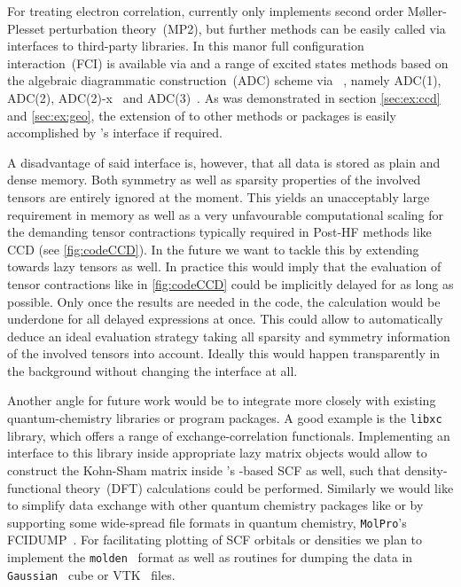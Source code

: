 For treating electron correlation,
\molsturm currently only implements
second order Møller-Plesset perturbation theory~(MP2),
but further methods can be easily called
via interfaces to third-party libraries.
In this manor full configuration interaction~(FCI) is available via \pyscf
and a range of excited states methods
based on the algebraic diagrammatic construction~(ADC) scheme
via \adcman~\cite{Wormit2014}, namely
ADC(1), ADC(2), ADC(2)-x~\cite{Schirmer1982}
and ADC(3)~\cite{Trofimov1999}.
As was demonstrated in section \ref{sec:ex:ccd} and \ref{sec:ex:geo},
the extension of \molsturm to other methods or packages
is easily accomplished by \molsturm's
\python interface if required.

A disadvantage of said interface is, however,
that all data is stored as plain and dense memory.
Both symmetry as well as sparsity properties of the involved tensors
are entirely ignored at the moment.
This yields an unacceptably large requirement in memory
as well as a very unfavourable computational scaling
for the demanding tensor contractions
typically required in Post-HF methods like CCD (see \fig \ref{fig:codeCCD}).
In the future we want to tackle this by extending
\lazyten towards lazy tensors as well.
In practice this would imply that the evaluation of
tensor contractions like in \fig \ref{fig:codeCCD} could be implicitly delayed
for as long as possible.
Only once the results are needed in the code,
the calculation would be underdone
for all delayed expressions at once.
This could allow to automatically deduce an ideal evaluation strategy
taking all sparsity and symmetry information
of the involved tensors into account.
Ideally this would happen transparently in the background
without changing the \python interface at all.

Another angle for future work would be to integrate more closely
with existing quantum-chemistry libraries or program packages.
A good example is the \texttt{libxc}~\cite{Lehtola2018} library,
which offers a range of exchange-correlation functionals.
Implementing an interface to this library inside appropriate
lazy matrix objects would allow to construct the Kohn-Sham matrix
inside \molsturm's \contraction-based SCF as well,
such that density-functional theory~(DFT) calculations
could be performed.
Similarly we would like to simplify
data exchange with other quantum chemistry packages like \pyscf or \psifour
by supporting some wide-spread file formats in quantum chemistry,
\eg \texttt{MolPro}'s FCIDUMP~\cite{Knowles1989}.
For facilitating plotting of SCF orbitals or densities
we plan to implement the \texttt{molden}~\cite{Schaftenaar2000} format
as well as routines for dumping the data
in \texttt{Gaussian}~\cite{Frisch2016} cube or VTK~\cite{Avila2010} files.

